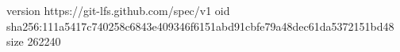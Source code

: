 version https://git-lfs.github.com/spec/v1
oid sha256:111a5417c740258c6843e409346f6151abd91cbfe79a48dec61da5372151bd48
size 262240
